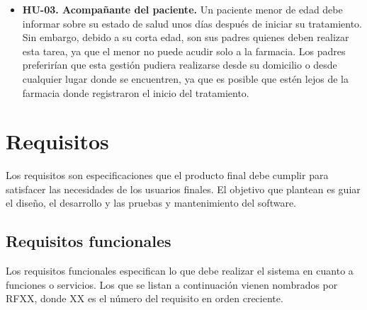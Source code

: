 \begin{itemize}
	\item \textbf{HU-03. Acompañante del paciente.} Un paciente menor de edad debe informar sobre su estado de salud unos días después de iniciar su tratamiento. Sin embargo, debido a su corta edad, son sus padres quienes deben realizar esta tarea, ya que el menor no puede acudir solo a la farmacia. Los padres preferirían que esta gestión pudiera realizarse desde su domicilio o desde cualquier lugar donde se encuentren, ya que es posible que estén lejos de la farmacia donde registraron el inicio del tratamiento.

\end{itemize}


\section{Requisitos}
Los requisitos son especificaciones que el producto final debe cumplir para satisfacer las necesidades de los usuarios finales. El objetivo que plantean es guiar el diseño, el desarrollo y las pruebas y mantenimiento del software. 

\subsection{Requisitos funcionales}
Los requisitos funcionales especifican lo que debe realizar el sistema en cuanto a funciones o servicios. Los que se listan a continuación vienen nombrados por RFXX, donde XX es el número del requisito en orden creciente.

